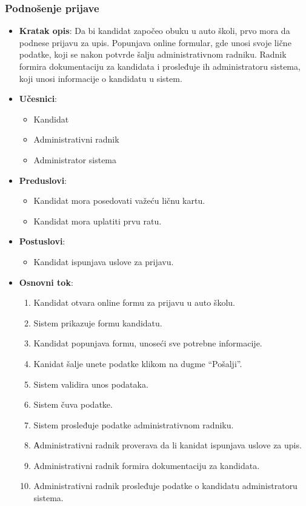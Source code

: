 \subsubsection{Podnošenje prijave}
\label{subsubsec:prijava}
\begin{itemize}
  \item \textbf{Kratak opis}: Da bi kandidat započeo obuku u auto školi, prvo mora da podnese prijavu za upis. Popunjava online formular, gde unosi svoje lične podatke, koji se nakon potvrde šalju administrativnom radniku. Radnik formira dokumentaciju za kandidata i prosleđuje ih administratoru sistema, koji unosi informacije o kandidatu u sistem.
  \item \textbf{Učesnici}: 
    \begin{itemize} 
      \item Kandidat
      \item Administrativni radnik
      \item Administrator sistema
    \end{itemize} 
  \item \textbf{Preduslovi}:
    \begin{itemize}
    \item Kandidat mora posedovati važeću ličnu kartu.
    \item Kandidat mora uplatiti prvu ratu.
    \end{itemize}
  \item \textbf{Postuslovi}:
      \begin{itemize}
      \item Kandidat ispunjava uslove za prijavu.
      \end{itemize}
  \item \textbf{Osnovni tok}:
      \begin{enumerate}
        \item Kandidat otvara online formu za prijavu u auto školu.
        \item Sistem prikazuje formu kandidatu.
        \item Kandidat popunjava formu, unoseći sve potrebne informacije.
        \item Kanidat šalje unete podatke klikom na dugme “Pošalji”.
        \item Sistem validira unos podataka.
        \item Sistem čuva podatke.
        \item Sistem prosleđuje podatke administrativnom radniku.
        \item Аdministrativni radnik proverava da li kanidat ispunjava uslove za upis.
        \item Administrativni radnik formira dokumentaciju za kandidata.
        \item Administrativni radnik prosleđuje podatke o kandidatu administratoru sistema.
      \end{enumerate}


\end{itemize}

